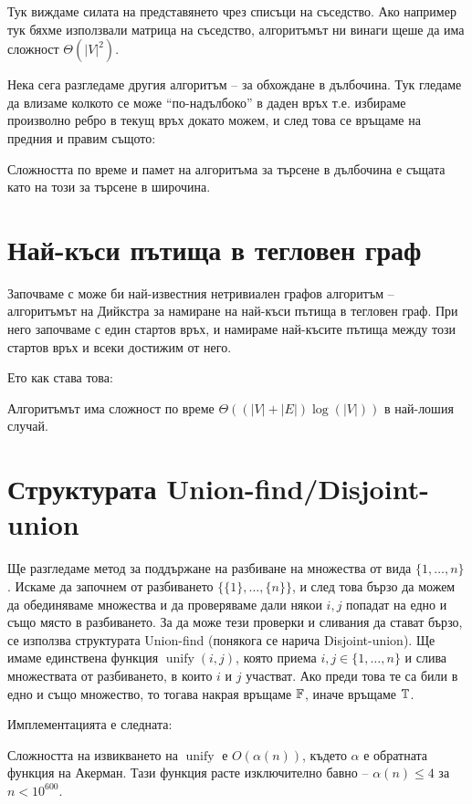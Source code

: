 Тук виждаме силата на представянето чрез списъци на съседство.
Ако например тук бяхме използвали матрица на съседство, алгоритъмът ни винаги щеше да има сложност $\Theta(|V|^2)$.

Нека сега разгледаме другия алгоритъм -- за обхождане в дълбочина.
Тук гледаме да влизаме колкото се може ``по-надълбоко'' в даден връх т.е. избираме произволно ребро в текущ връх докато можем, и след това се връщаме на предния и правим същото:



Сложността по време и памет на алгоритъма за търсене в дълбочина е същата като на този за търсене в широчина.

\newpage

\section{Най-къси пътища в тегловен граф}

Започваме с може би най-известния нетривиален графов алгоритъм -- алгоритъмът на Дийкстра за намиране на най-къси пътища в тегловен граф.
При него започваме с един стартов връх, и намираме най-късите пътища между този стартов връх и всеки достижим от него.

Ето как става това:

Алгоритъмът има сложност по време $\Theta((|V| + |E|)\log(|V|))$ в най-лошия случай.

\section{Структурата Union-find/Disjoint-union}

Ще разгледаме метод за поддържане на разбиване на множества от вида $\{ 1, \dots, n \}$.
Искаме да започнем от разбиването $\{ \{ 1 \}, \dots, \{ n \} \}$, и след това бързо да можем да обединяваме множества и да проверяваме дали някои $i, j$ попадат на едно и също място в разбиването.
За да може тези проверки и сливания да стават бързо, се използва структурата Union-find (понякога се нарича Disjoint-union).
Ще имаме единствена функция $\operatorname{unify}(i, j)$, която приема $i, j \in \{ 1, \dots, n \}$ и слива множествата от разбиването, в които $i$ и $j$ участват.
Ако преди това те са били в едно и също множество, то тогава накрая връщаме $\mathbb{F}$, иначе връщаме $\mathbb{T}$.

Имплементацията е следната:

Сложността на извикването на $\operatorname{unify}$ е $O(\alpha(n))$, където $\alpha$ е обратната функция на Акерман.
Тази функция расте изключително бавно -- $\alpha(n) \leq 4$ за $n < 10^{600}$.

